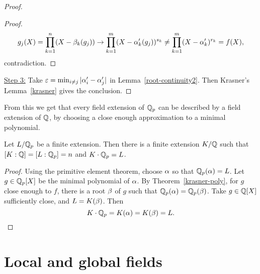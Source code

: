 \begin{proof}
\begin{proof}
\[
g_j(X)=\prod_{k=1}^n (X-\beta_k(g_j))\to \prod_{k=1}^m(X-\alpha_k'(g_j))^{s_k}\ne \prod_{k=1}^m(X-\alpha_k')^{r_k}=f(X),
\]
contradiction.
\end{proof}
\noindent\underline{Step 3:} Take $\varepsilon=\min_{i\ne j} |\alpha_i' - \alpha_j'|$ in Lemma~\ref{root-continuity2}. Then Krasner's Lemma~\ref{krasner} gives the conclusion.
\end{proof}
From this we get that every field extension of $\mathbb{Q}_p$ can be described by a field extension of $\mathbb{Q}$, by choosing a close enough approximation to a minimal polynomial.


\begin{cor}
Let $L/\mathbb{Q}_p$ be a finite extension. Then there is a finite extension $K/\mathbb{Q}$ such that $[K:\mathbb{Q}]=[L:\mathbb{Q}_p]=n$ and $K\cdot \mathbb{Q}_p=L$.
\end{cor}
\begin{proof}
Using the primitive element theorem, choose $\alpha$ so that $\mathbb{Q}_p(\alpha)=L$. Let $g\in \mathbb{Q}_p[X]$ be the minimal polynomial of $\alpha$. By Theorem~\ref{krasner-poly}, for $g$ close enough to $f$, there is a root $\beta$ of $g$ such that $\mathbb{Q}_p(\alpha)=\mathbb{Q}_p(\beta)$. Take $g\in \mathbb{Q}[X]$ sufficiently close, and $L=K(\beta)$. Then 
\[K\cdot \mathbb{Q}_p=K(\alpha)=K(\beta)=L.\qedhere \]
\end{proof}
\chapter{Local and global fields}
